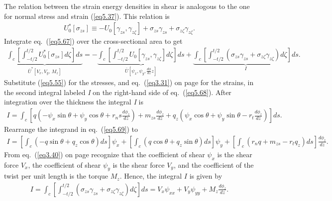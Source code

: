 \documentclass{AeroStructure-ERJohnson}
\begin{document}
The relation between the strain energy densities in shear is analogous to the one for normal stress and strain (\ref{eq5.37}). This relation is
\begin{align}\label{eq5.67}
U_{0}^{*}\left[\sigma_{z s}\right] \equiv-U_{0}\left[\gamma_{z s}, \gamma_{z \zeta}\right]+\sigma_{z s} \gamma_{z s}+\sigma_{z \zeta} \gamma_{z \zeta}.
\end{align}
Integrate eq.~(\ref{eq5.67}) over the cross-sectional area to get
\begin{align}\label{eq5.68}
\underbrace{\int_{c}\left[\int_{-t / 2}^{t / 2} U_{0}^{*}\left[\sigma_{z s}\right] d \zeta\right] d s}_{\bar{U}^{*}\left[V_{x}, V_{y},\, M_{z}\right]}= -\underbrace{\int_{c}\left[\int_{-t / 2}^{t/2} U_{0}\left[\gamma_{z s}, \gamma_{z \zeta}\right] d \zeta\right] d s}_{\bar{U}\left[\psi_{x}, \psi_{y}, \frac{d \phi}{d z} z\right]}+ \underbrace{\int_c\left[\int_{-t / 2}^{t / 2}\left(\sigma_{z s} \gamma_{z s}+\sigma_{z \zeta} \gamma_{z \zeta}\right) d \zeta\right] d s}_{I}.
\end{align}
Substitute (\ref{eq5.55}) for the stresses, and eq.~(\ref{eq3.31}) on page \pageref{eq3.31} for the strains, in the second integral labeled \textit{I} on the right-hand side of eq.~(\ref{eq5.68}). After integration over the thickness the integral \textit{I} is
\begin{align}\label{eq5.69}
I=\int_{c}\left[q\left(-\psi_{x} \sin \theta+\psi_{y} \cos \theta+r_{n} s \frac{d \phi_{z}}{d z}\right)+m_{z s} \frac{d \phi_{z}}{d z}+q_{z}\left(\psi_{x} \cos \theta+\psi_{y} \sin \theta-r_{t} \frac{d \phi_{z}}{d z}\right)\right] d s.
\end{align}
Rearrange the integrand in eq.~(\ref{eq5.69}) to
\begin{align}\label{eq5.70}
I=\left[\int_{c}\left(-q \sin \theta+q_{z} \cos \theta\right) d s\right] \psi_{x}+\left[\int_{c}\left(q \cos \theta+q_{z} \sin \theta\right) d s\right] \psi_{y}+\left[\int_{c}\left(r_{n} q+m_{z s}-r_{t} q_{z}\right) d s\right] \frac{d \phi_{z}}{d z}.
\end{align}
From eq.~(\ref{eq3.40}) on page \pageref{eq3.40} recognize that the coefficient of shear $\psi_{x}$ is the shear force $V_x$, the coefficient of shear $\psi_{y}$ is the shear force $V_y$, and the coefficient of the twist per unit length is the torque $M_z$. Hence, the integral $I$ is given by
\begin{align}\label{eq5.71}
I=\int_{c}\left[\int_{-t / 2}^{t / 2}\left(\sigma_{z s} \gamma_{z s}+\sigma_{z \zeta} \gamma_{z \zeta}\right) d \zeta\right] d s=V_{x} \psi_{x x}+V_{y} \psi_{y y}+M_{z} \frac{d \phi_{z}}{d z}.
\end{align}
\end{document}
